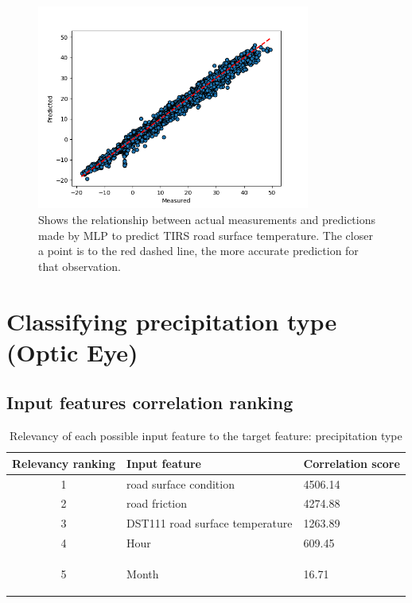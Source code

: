 \begin{figure}[H] 
	\centering
	\includegraphics[width=0.8\textwidth]{media/tirs_predictions.png}
	\caption{Shows the relationship between actual measurements and predictions made by MLP to predict TIRS road surface temperature. The closer a point is to the red dashed line, the more accurate prediction for that observation. }
	\label{fig:scatter_mlp}
\end{figure}
	
\section{Classifying precipitation type (Optic Eye)}
\subsection{Input features correlation ranking}
	\begin{table}[H]
		\centering
		\caption{Relevancy of each possible input feature to the target feature: precipitation type }
		\begin{tabular}[3]{c | l | l }
    			Relevancy ranking & Input feature & Correlation score  \\
			 \hline
			1 & road surface condition & 4506.14 \\ \hline
			2 & road friction & 4274.88 \\ \hline
			3 & DST111 road surface temperature & 1263.89 \\ \hline
			4 & Hour & 609.45 \\ \hline
			5 & Month & 16.71 
 
			\label{table:feature_comparison_prectype}
		\end{tabular}
	\end{table}

